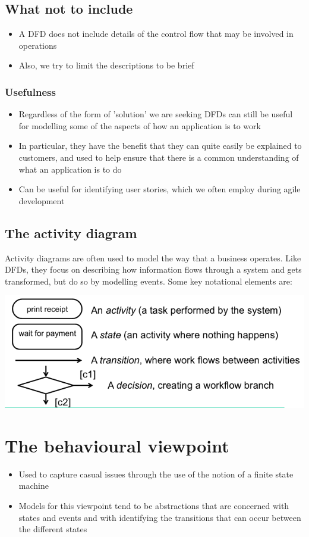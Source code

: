 \documentclass{article}[18pt]
\begin{document}
\subsection{What not to include}
\begin{itemize}
	\item A DFD does not include details of the control flow that may be involved in operations
	\item Also, we try to limit the descriptions to be brief
\end{itemize}
\subsubsection{Usefulness}
\begin{itemize}
	\item Regardless of the form of 'solution' we are seeking DFDs can still be useful for modelling some of the aspects of how an application is to work
	\item In particular, they have the benefit that they can quite easily be explained to customers, and used to help ensure that there is a common understanding of what an application is to do
	\item Can be useful for identifying user stories, which we often employ during agile development
\end{itemize}
\subsection{The activity diagram}
Activity diagrams are often used to model the way that a business operates. Like DFDs, they focus on describing how information flows through a system and gets transformed, but do so by modelling events. Some key notational elements are:
\begin{center}
	\includegraphics[scale=0.7]{"activity diagram"}
\end{center}
\section{The behavioural viewpoint}
\begin{itemize}
	\item Used to capture casual issues through the use of the notion of a finite state machine
	\item Models for this viewpoint tend to be abstractions that are concerned with states and events and with identifying the transitions that can occur between the different states
\end{itemize}
\end{document}
